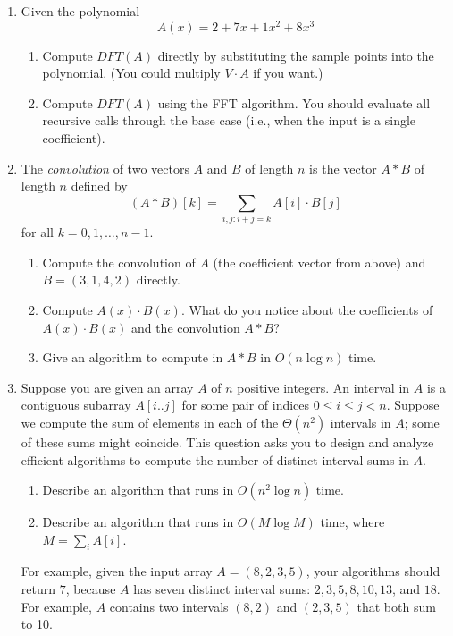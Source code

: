 \documentclass[11pt]{article}
\begin{document}

\noindent

\begin{enumerate}\itemsep3ex\parindent1.5em
\item    Given the polynomial
	\[A(x) = 2 + 7x + 1x^2 + 8x^3\]

\begin{enumerate}
	\item Compute $DFT(A)$ directly by substituting the sample points into the polynomial.
    (You could multiply $V \cdot A$ if you want.)
    \item Compute $DFT(A)$ using the FFT algorithm. You should evaluate all
    recursive calls through the base case (i.e., when the input is a single
    coefficient).
\end{enumerate}

\item The \emph{convolution} of two vectors $A$ and $B$ of length $n$ is the
vector $A*B$ of length $n$ defined by
\[(A*B)[k] = \sum_{i,j: i+j=k} A[i] \cdot B[j]\]
for all $k=0,1,\ldots,n-1$.

\begin{enumerate}
    \item Compute the convolution of $A$ (the coefficient vector from above) and $B=(3,1,4,2)$ directly.

    \item Compute $A(x) \cdot B(x)$. What do you notice about the coefficients of $A(x) \cdot B(x)$ and the convolution $A*B$?

    \item Give an algorithm to compute in $A*B$ in $O(n \log n)$ time.
\end{enumerate}

\item Suppose you are given an array $A$ of $n$ positive integers. An interval in $A$ is a contiguous
subarray $A[i..j]$ for some pair of indices $0 \leq i \leq j < n$. Suppose we compute the sum of
elements in each of the $\Theta(n^2)$ intervals in $A$; some of these sums might coincide. This
question asks you to design and analyze efficient algorithms to compute the number of
distinct interval sums in $A$.
\begin{enumerate}
    \item 
Describe an algorithm that runs in $O(n^2 \log n)$ time.
\item Describe an algorithm that runs in $O(M \log M)$ time, where $M = \sum_{i} A[i]$.
 
\end{enumerate}

For example, given the input array $A = (8, 2, 3, 5)$, your algorithms should return $7$, because
$A$ has seven distinct interval sums: $2, 3, 5, 8, 10, 13$, and $18$. For example, $A$ contains two
intervals $(8, 2)$ and $(2, 3, 5)$ that both sum to 10.
\end{enumerate}
\end{document}
